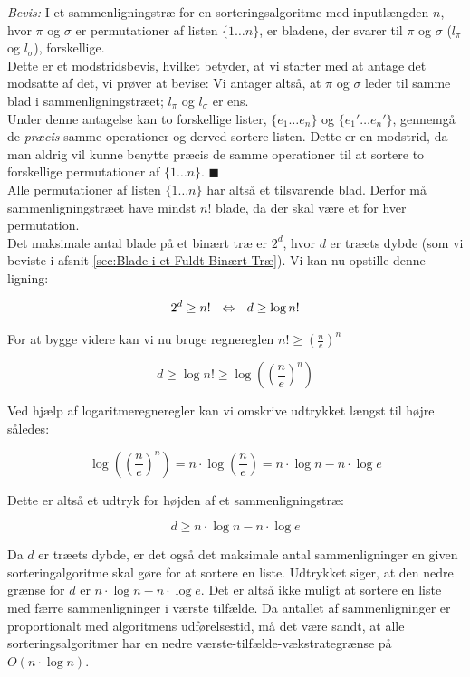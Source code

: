 \emph{Bevis:} I et sammenligningstræ for en sorteringsalgoritme med inputlængden $n$, hvor $\pi$ og $\sigma$ er permutationer af listen $\{1 \dots n\}$, er bladene, der svarer til $\pi$ og $\sigma$ ($l_{\pi}$ og $l_{\sigma}$), forskellige.\\

Dette er et modstridsbevis, hvilket betyder, at vi starter med at antage det modsatte af det, vi prøver at bevise: Vi antager altså, at $\pi$ og $\sigma$ leder til samme blad i sammenligningstræet; $l_{\pi}$ og $l_{\sigma}$ er ens.\\

Under denne antagelse kan to forskellige lister, $\{e_1 \dots e_n\}$ og $\{e_1' \dots e_n'\}$, gennemgå de \emph{præcis} samme operationer og derved sortere listen. Dette er en modstrid, da man aldrig vil kunne benytte præcis de samme operationer til at sortere to forskellige permutationer af $\{1 \dots n\}$. $\blacksquare$ \\


Alle permutationer af listen $\{1 \dots n\}$ har altså et tilsvarende blad. Derfor må sammenligningstræet have mindst $n!$ blade, da der skal være et for hver permutation.\\

Det maksimale antal blade på et binært træ er $2^d$, hvor $d$ er træets dybde (som vi beviste i afsnit \ref{sec:Blade i et Fuldt Binært Træ}). Vi kan nu opstille denne ligning:


$$2^d \geq n! \:\:\:\Leftrightarrow\:\:\: d \geq \log n!$$

For at bygge videre kan vi nu bruge regnereglen $n! \geq \left( \frac{n}{e} \right)^n$

$$d \geq \log n! \geq \log \left(\left(\frac{n}{e}\right)^n\right)$$

Ved hjælp af logaritmeregneregler kan vi omskrive udtrykket længst til højre således:

$$\log \left(\left(\frac{n}{e}\right)^n\right) = n \cdot \log \left(\frac{n}{e} \right) = n \cdot \log n - n \cdot \log e$$

Dette er altså et udtryk for højden af et sammenligningstræ:

$$d \geq n \cdot \log n - n \cdot \log e$$

Da $d$ er træets dybde, er det også det maksimale antal sammenligninger en given sorteringalgoritme skal gøre for at sortere en liste. Udtrykket siger, at den nedre grænse for $d$ er $n \cdot \log n - n \cdot \log e$. Det er altså ikke muligt at sortere en liste med færre sammenligninger i værste tilfælde. Da antallet af sammenligninger er proportionalt med algoritmens udførelsestid, må det være sandt, at alle sorteringsalgoritmer har en nedre værste-tilfælde-vækstrategrænse på $O(n \cdot \log n)$.


